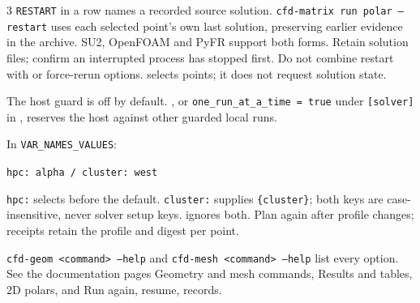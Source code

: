 \begin{multicols}{3}
\texttt{RESTART} in a row names a recorded source solution.
\texttt{cfd-matrix run polar --restart} uses each selected point's own last
solution, preserving earlier evidence in the archive. SU2, OpenFOAM and PyFR
support both forms. Retain solution files; confirm an interrupted process has
stopped first. Do not combine restart with  or force-rerun options.
 selects points; it does not request solution state.

The host guard is off by default. , or
\texttt{one\_run\_at\_a\_time = true} under \texttt{[solver]} in , reserves the host
against other guarded local runs.\par
In \texttt{VAR\_NAMES\_VALUES}:\par
\texttt{hpc: alpha / cluster: west}\par
\texttt{hpc:} selects  before the  default.
\texttt{cluster:} supplies \texttt{\{cluster\}}; both keys are case-insensitive,
never solver setup keys.  ignores both. Plan again after profile
changes; receipts retain the profile and digest per point.

\texttt{cfd-geom <command> --help} and \texttt{cfd-mesh <command> --help} list
every option. See the documentation pages Geometry and mesh commands, Results
and tables, 2D polars, and Run again, resume, records.
\end{multicols}
\foot
